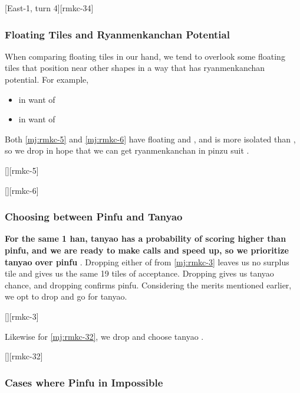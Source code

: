 \documentclass[12pt]{article}
\begin{document}
[East-1, turn 4][rmkc-34]


\subsubsection*{Floating Tiles and Ryanmenkanchan Potential}

When comparing floating tiles in our hand, we tend to overlook some floating tiles that position near other shapes in a way that has ryanmenkanchan potential. For example,

\begin{itemize}
\item {} in want of 
\item {} in want of 
\end{itemize}

Both \ref{mj:rmkc-5} and \ref{mj:rmkc-6} have floating  and , and  is more isolated than , so we drop  in hope that we can get ryanmenkanchan in pinzu suit \citep[][p.~122]{uzaku-haikouritsu}.

[][rmkc-5]

[][rmkc-6]


\subsubsection*{Choosing between Pinfu and Tanyao} 

\textbf{For the same 1 han, tanyao has a probability of scoring higher than pinfu, and we are ready to make calls and speed up, so we prioritize tanyao over pinfu} \citep[][p.~119]{uzaku-haikouritsu}. Dropping either of  from \ref{mj:rmkc-3} leaves us no surplus tile and gives us the same 19 tiles of acceptance. Dropping  gives us tanyao chance, and dropping  confirms pinfu. Considering the merits mentioned earlier, we opt to drop  and go for tanyao.

[][rmkc-3]

Likewise for \ref{mj:rmkc-32}, we drop  and choose tanyao \citep[][p. 10]{uzaku-nankiru}.

[][rmkc-32]


\subsubsection*{Cases where Pinfu in Impossible}
\end{document}
